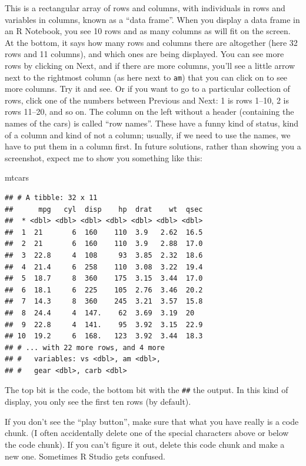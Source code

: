 \documentclass[]{tufte-book}
\newenvironment{Shaded}{}{}
\newcommand{\NormalTok}[1]{#1}
\theoremstyle{definition}
\theoremstyle{definition}
\theoremstyle{definition}
\theoremstyle{remark}
\begin{document}
This is a rectangular array of rows and columns, with individuals in
rows and variables in columns, known as a ``data frame''. When you
display a data frame in an R Notebook, you see 10 rows and as many
columns as will fit on the screen. At the bottom, it says how many rows
and columns there are altogether (here 32 rows and 11 columns), and
which ones are being displayed. You can see more rows by clicking on
Next, and if there are more columns, you'll see a little arrow next to
the rightmost column (as here next to \texttt{am}) that you can click on
to see more columns. Try it and see. Or if you want to go to a
particular collection of rows, click one of the numbers between Previous
and Next: 1 is rows 1--10, 2 is rows 11--20, and so on. The column on
the left without a header (containing the names of the cars) is called
``row names''. These have a funny kind of status, kind of a column and
kind of not a column; usually, if we need to use the names, we have to
put them in a column first. In future solutions, rather than showing you
a screenshot, expect me to show you something like this:

\begin{Shaded}
\begin{Highlighting}[]
\NormalTok{mtcars}
\end{Highlighting}
\end{Shaded}

\begin{verbatim}
## # A tibble: 32 x 11
##      mpg   cyl  disp    hp  drat    wt  qsec
##  * <dbl> <dbl> <dbl> <dbl> <dbl> <dbl> <dbl>
##  1  21       6  160    110  3.9   2.62  16.5
##  2  21       6  160    110  3.9   2.88  17.0
##  3  22.8     4  108     93  3.85  2.32  18.6
##  4  21.4     6  258    110  3.08  3.22  19.4
##  5  18.7     8  360    175  3.15  3.44  17.0
##  6  18.1     6  225    105  2.76  3.46  20.2
##  7  14.3     8  360    245  3.21  3.57  15.8
##  8  24.4     4  147.    62  3.69  3.19  20  
##  9  22.8     4  141.    95  3.92  3.15  22.9
## 10  19.2     6  168.   123  3.92  3.44  18.3
## # ... with 22 more rows, and 4 more
## #   variables: vs <dbl>, am <dbl>,
## #   gear <dbl>, carb <dbl>
\end{verbatim}

The top bit is the code, the bottom bit with the \texttt{\#\#} the
output. In this kind of display, you only see the first ten rows (by
default).

If you don't see the ``play button'', make sure that what you have
really is a code chunk. (I often accidentally delete one of the special
characters above or below the code chunk). If you can't figure it out,
delete this code chunk and make a new one. Sometimes R Studio gets
confused.
\end{document}
